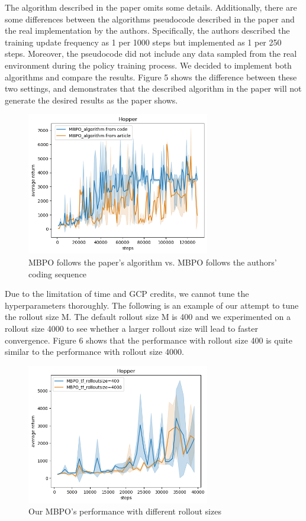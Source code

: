 \documentclass{article}
\begin{document}
The algorithm described in the paper omits some details. Additionally, there are some differences between the algorithms pseudocode described in the paper and the real implementation by the authors. Specifically, the authors described the training update frequency as 1 per 1000 steps but implemented as 1 per 250 steps. Moreover, the pseudocode did not include any data sampled from the real environment during the policy training process. We decided to implement both algorithms and compare the results. Figure 5 shows the difference between these two settings, and demonstrates that the described algorithm in the paper will not generate the desired results as the paper shows.

\begin{figure}[h]
  \centering
  \includegraphics[width=8cm]{paperVsCodeMBPO}
  \caption{MBPO follows the paper's algorithm vs. MBPO follows the authors' coding sequence}
\end{figure}

Due to the limitation of time and GCP credits, we cannot tune the hyperparameters thoroughly. The following is an example of our attempt to tune the rollout size M. The default rollout size M is 400 and we experimented on a rollout size 4000 to see whether a larger rollout size will lead to faster convergence. Figure 6 shows that the performance with rollout size 400 is quite similar to the performance with rollout size 4000.

\begin{figure}[h]
  \centering
  \includegraphics[width=8cm]{differentRollOutSize}
  \caption{Our MBPO's performance with different rollout sizes}
\end{figure}
\end{document}
